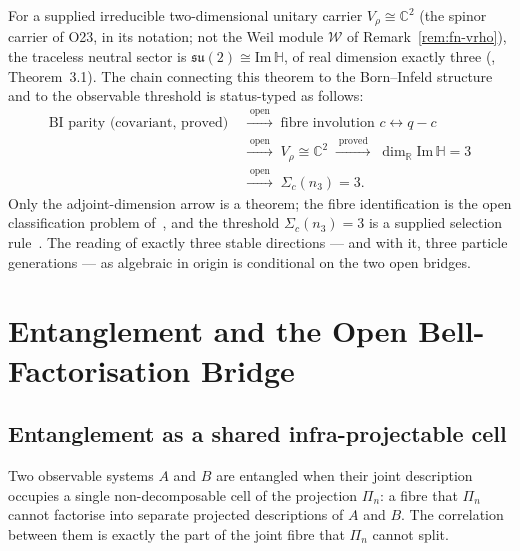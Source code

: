 \documentclass[11pt,a4paper]{article}
\begin{document}
    For a supplied irreducible two-dimensional unitary carrier
    $V_\rho \cong \mathbb{C}^2$ (the spinor carrier of O23, in its notation; not the Weil module $\mathcal{W}$ of
    Remark~\ref{rem:fn-vrho}), the traceless neutral sector is
    $\mathfrak{su}(2) \cong \mathrm{Im}\,\mathbb{H}$, of real dimension
    exactly three (\cite{Beau2026a27}, Theorem~3.1).
    The chain connecting this theorem to the Born--Infeld structure and to
    the observable threshold is status-typed as follows:
    \begin{equation}
      \begin{aligned}
        \text{BI parity (covariant, proved)}
        &\;\xrightarrow{\;\text{open}\;}\; \text{fibre involution } c \leftrightarrow q-c \\
        &\;\xrightarrow{\;\text{open}\;}\; V_\rho \cong \mathbb{C}^2
        \;\xrightarrow{\;\text{proved}\;}\; \dim_{\mathbb{R}} \mathrm{Im}\,\mathbb{H} = 3 \\
        &\;\xrightarrow{\;\text{open}\;}\; \Sigma_c(n_3) = 3.
      \end{aligned}
    \end{equation}
    Only the adjoint-dimension arrow is a theorem; the fibre identification is
    the open classification problem of~\cite{Beau2026a22}, and the threshold
    $\Sigma_c(n_3) = 3$ is a supplied selection rule~\cite{Beau2026a27}.
    The reading of exactly three stable directions — and with it, three
    particle generations — as algebraic in origin is conditional on the two
    open bridges.

    \clearpage
  \section{Entanglement and the Open Bell-Factorisation Bridge}
  \label{sec:entanglement}

  \subsection{Entanglement as a shared infra-projectable cell}

    Two observable systems $A$ and $B$ are entangled when their joint description occupies a single
    non-decomposable cell of the projection $\Pi_n$: a fibre that $\Pi_n$ cannot factorise into separate
    projected descriptions of $A$ and $B$.
    The correlation between them is exactly the part of the joint fibre that $\Pi_n$ cannot split.
\end{document}
